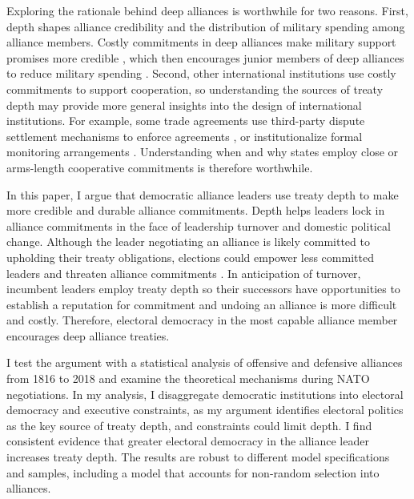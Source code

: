 \documentclass[12pt]{article}
\begin{document}
Exploring the rationale behind deep alliances is worthwhile for two reasons.
First, depth shapes alliance credibility and the distribution of military spending among alliance members. 
Costly commitments in deep alliances make military support promises more credible \citep{Morrow1994}, which then encourages junior members of deep alliances to reduce military spending \citep{Alley2021isq}.  
Second, other international institutions use costly commitments to support cooperation, so understanding the sources of treaty depth may provide more general insights into the design of international institutions.  
For example, some trade agreements use third-party dispute settlement mechanisms to enforce agreements \citep{Smith2000}, or institutionalize formal monitoring arrangements \citep{Duretal2013}.  
Understanding when and why states employ close or arms-length cooperative commitments is therefore worthwhile. 


In this paper, I argue that democratic alliance leaders use treaty depth to make more credible and durable alliance commitments. 
Depth helps leaders lock in alliance commitments in the face of leadership turnover and domestic political change. 
Although the leader negotiating an alliance is likely committed to upholding their treaty obligations, elections could empower less committed leaders and threaten alliance commitments \citep{GartzkeGleditsch2004, LeedsSavun2007, Leedsetal2009, Mattes2012a}.
In anticipation of turnover, incumbent leaders employ treaty depth so their successors have opportunities to establish a reputation for commitment and undoing an alliance is more difficult and costly. 
Therefore, electoral democracy in the most capable alliance member encourages deep alliance treaties. 


I test the argument with a statistical analysis of offensive and defensive alliances from 1816 to 2018 and examine the theoretical mechanisms during NATO negotiations.
In my analysis, I disaggregate democratic institutions into electoral democracy and executive constraints, as my argument identifies electoral politics as the key source of treaty depth, and constraints could limit depth. 
I find consistent evidence that greater electoral democracy in the alliance leader increases treaty depth. 
The results are robust to different model specifications and samples, including a model that accounts for non-random selection into alliances. 
\end{document}
